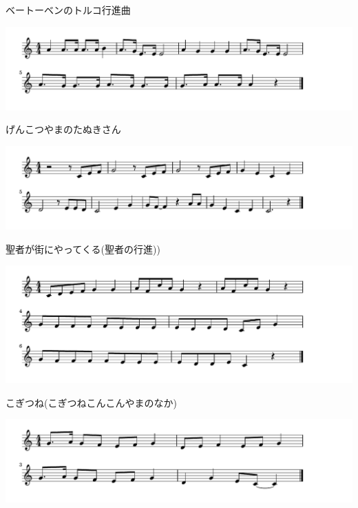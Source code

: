 \documentclass[a4paper]{ltjsarticle}
\begin{document}
\vspace{-10mm} \hspace{10mm}
ベートーベンのトルコ行進曲

\includegraphics[clip]{genkotsu_crop.pdf}

\vspace{-10mm} \hspace{10mm}
げんこつやまのたぬきさん

\includegraphics[clip]{seija_crop.pdf}

\vspace{-10mm} \hspace{10mm}
聖者が街にやってくる(聖者の行進))

\includegraphics[clip]{kogitsune_crop.pdf}

\vspace{-10mm} \hspace{10mm}
こぎつね(こぎつねこんこんやまのなか)

\includegraphics[clip]{londonbashi_crop.pdf}
\end{document}
